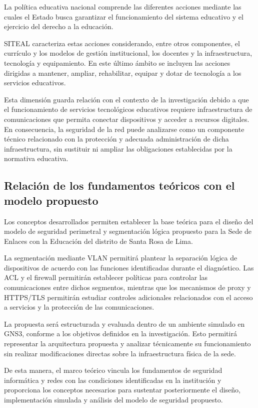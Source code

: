 La política educativa nacional comprende las diferentes acciones mediante las cuales el Estado busca garantizar el funcionamiento del sistema educativo y el ejercicio del derecho a la educación.

SITEAL caracteriza estas acciones considerando, entre otros componentes, el currículo y los modelos de gestión institucional, los docentes y la infraestructura, tecnología y equipamiento. En este último ámbito se incluyen las acciones dirigidas a mantener, ampliar, rehabilitar, equipar y dotar de tecnología a los servicios educativos.



Esta dimensión guarda relación con el contexto de la investigación debido a que el funcionamiento de servicios tecnológicos educativos requiere infraestructura de comunicaciones que permita conectar dispositivos y acceder a recursos digitales. En consecuencia, la seguridad de la red puede analizarse como un componente técnico relacionado con la protección y adecuada administración de dicha infraestructura, sin sustituir ni ampliar las obligaciones establecidas por la normativa educativa.

\subsection{Relación de los fundamentos teóricos con el modelo propuesto}

Los conceptos desarrollados permiten establecer la base teórica para el diseño del modelo de seguridad perimetral y segmentación lógica propuesto para la Sede de Enlaces con la Educación del distrito de Santa Rosa de Lima.

La segmentación mediante VLAN permitirá plantear la separación lógica de dispositivos de acuerdo con las funciones identificadas durante el diagnóstico. Las ACL y el firewall permitirán establecer políticas para controlar las comunicaciones entre dichos segmentos, mientras que los mecanismos de proxy y HTTPS/TLS permitirán estudiar controles adicionales relacionados con el acceso a servicios y la protección de las comunicaciones.

La propuesta será estructurada y evaluada dentro de un ambiente simulado en GNS3, conforme a los objetivos definidos en la investigación. Esto permitirá representar la arquitectura propuesta y analizar técnicamente su funcionamiento sin realizar modificaciones directas sobre la infraestructura física de la sede.

De esta manera, el marco teórico vincula los fundamentos de seguridad informática y redes con las condiciones identificadas en la institución y proporciona los conceptos necesarios para sustentar posteriormente el diseño, implementación simulada y análisis del modelo de seguridad propuesto.

